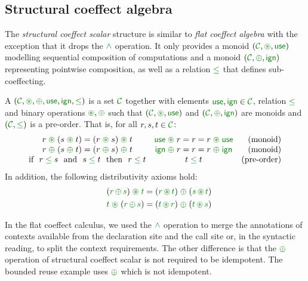 
\subsection{Structural coeffect algebra}

The \emph{structural coeffect scalar} structure is similar to \emph{flat coeffect algebra} with the 
exception that it drops the $\czip$ operation. It only provides a monoid $(\C, \cseq, \cunit)$
modelling sequential composition of computations and a monoid $(\C, \cpar, \czero)$ representing
pointwise composition, as well as a relation $\cleq$ that defines sub-coeffecting.

\begin{definition}
\label{def:structural-scalar}
A \emph{} $(\C, \cseq, \cpar, \cunit, \czero, \cleq)$ is a set 
$\C$ together with elements $\cunit, \czero \in \C$, relation $\cleq$ and binary operations 
$\cseq, \cpar$ such that $(\C, \cseq, \cunit)$ and $(\C, \cpar, \czero)$ are monoids and
$(\C, \cleq)$ is a pre-order. That is, for all $r,s,t\in \C$:
%
\begin{equation*}
\begin{array}{ccr}
r \;\cseq\; (s \;\cseq\; t) = (r \;\cseq\; s) \;\cseq\; t  &
\cunit \;\cseq\; r = r = r \;\cseq\; \cunit &
\textnormal{(monoid)}   
\\
r \;\cpar\; (s \;\cpar\; t) = (r \;\cpar\; s) \;\cpar\; t &
\czero \;\cpar\; r = r = r \;\cpar\; \czero &
\textnormal{(monoid)}   
\\
\textnormal{if}~~r\; \cleq\; s ~~\textnormal{and}~~s\; \cleq\; t~~\textnormal{then}~~r\; \cleq\; t&
t\; \cleq\; t &
\textnormal{(pre-order)}   
\end{array}
\end{equation*}
%
In addition, the following distributivity axioms hold:
\begin{align*}
\quad (\cclrd{r}\, \cpar\, \cclrd{s}) \;\cseq\; \cclrd{t} & = (\cclrd{r} \,\cseq\, \cclrd{t}) \;\cpar\; (\cclrd{s}\, \cseq\, \cclrd{t}) \\
\quad \cclrd{t} \;\cseq\; (\cclrd{r}\, \cpar\, \cclrd{s}) & = (\cclrd{t} \,\cseq\, \cclrd{r}) \;\cpar\; (\cclrd{t}\, \cseq\, \cclrd{s})
\end{align*}
\end{definition}

\noindent
In the flat coeffect calculus, we used the $\czip$ operation to merge the annotations of contexts
available from the declaration site and the call site or, in the syntactic reading, to split the 
context requirements. The other difference is that the $\cpar$ operation of structural coeffect
scalar is not required to be idempotent. The bounded reuse example uses $\cpar$ which is not 
idempotent.

